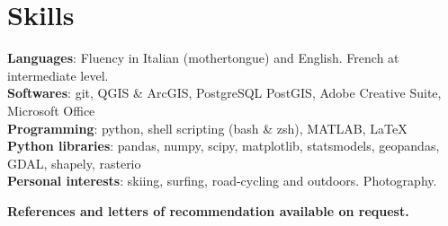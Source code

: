 \documentclass[letterpaper,11pt]{article}
\begin{document}
\section{Skills}
 \begin{itemize}[leftmargin=0.15in, label={}]
    \small{\item{
     \textbf{Languages}{: Fluency in Italian (mothertongue) and English. French at intermediate level.} \\
     \textbf{Softwares}{: git, QGIS \& ArcGIS, PostgreSQL PostGIS, Adobe Creative Suite, \indent Microsoft Office} \\
     \textbf{Programming}{: python, shell scripting (bash \& zsh), MATLAB, \LaTeX} \\
     \textbf{Python libraries}{: pandas, numpy, scipy, matplotlib, statsmodels, geopandas, GDAL, shapely, rasterio}\\
     \textbf{Personal interests}{: skiing, surfing, road-cycling and outdoors. Photography.}\\
}}
 \end{itemize}

\centering
\textbf{References and letters of recommendation available on request.}

\end{document}
